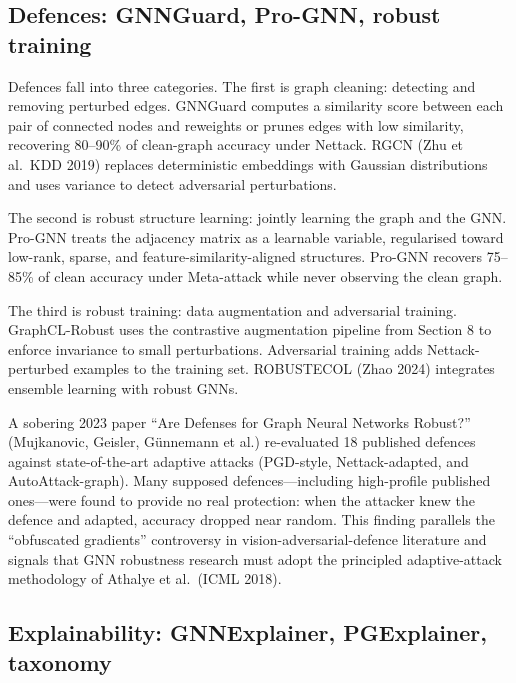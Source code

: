 \documentclass{article}
\begin{document}
\subsection{Defences: GNNGuard, Pro-GNN, robust training}\label{defences-gnnguard-pro-gnn-robust-training}

Defences fall into three categories. The first is graph cleaning: detecting and removing perturbed edges. GNNGuard \citep{zhang2020gnnguarddefendingg} computes a similarity score between each pair of connected nodes and reweights or prunes edges with low similarity, recovering 80--90\% of clean-graph accuracy under Nettack. RGCN (Zhu et al.~KDD 2019) replaces deterministic embeddings with Gaussian distributions and uses variance to detect adversarial perturbations.

The second is robust structure learning: jointly learning the graph and the GNN. Pro-GNN \citep{jin2020graphstructurelear} treats the adjacency matrix as a learnable variable, regularised toward low-rank, sparse, and feature-similarity-aligned structures. Pro-GNN recovers 75--85\% of clean accuracy under Meta-attack while never observing the clean graph.

The third is robust training: data augmentation and adversarial training. GraphCL-Robust uses the contrastive augmentation pipeline from Section 8 to enforce invariance to small perturbations. Adversarial training adds Nettack-perturbed examples to the training set. ROBUSTECOL (Zhao 2024) integrates ensemble learning with robust GNNs.

A sobering 2023 paper ``Are Defenses for Graph Neural Networks Robust?'' (Mujkanovic, Geisler, Günnemann et al.) re-evaluated 18 published defences against state-of-the-art adaptive attacks (PGD-style, Nettack-adapted, and AutoAttack-graph). Many supposed defences---including high-profile published ones---were found to provide no real protection: when the attacker knew the defence and adapted, accuracy dropped near random. This finding parallels the ``obfuscated gradients'' controversy in vision-adversarial-defence literature and signals that GNN robustness research must adopt the principled adaptive-attack methodology of Athalye et al.~(ICML 2018).

\subsection{Explainability: GNNExplainer, PGExplainer, taxonomy}\label{explainability-gnnexplainer-pgexplainer-taxonomy}
\end{document}
